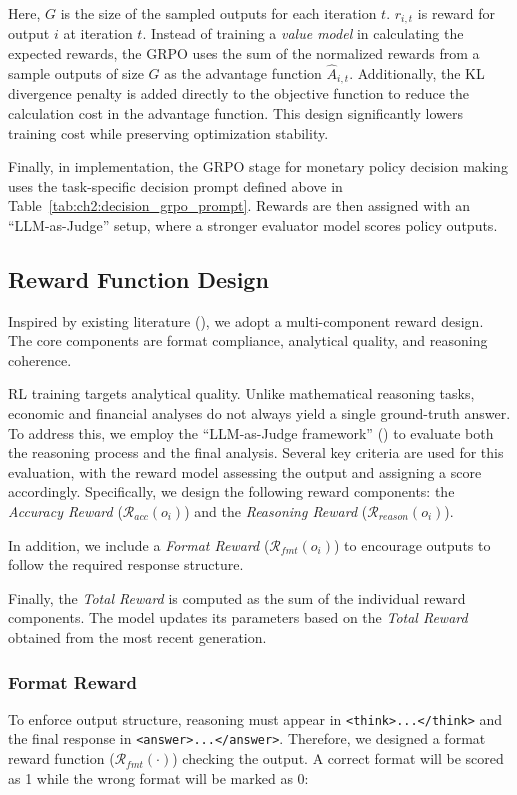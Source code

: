 Here, $G$ is the size of the sampled outputs for each iteration $t$. $r_{i,t}$ is reward for output $i$ at iteration $t$. Instead of training a \textit{value model} in calculating the expected rewards, the GRPO uses the sum of the normalized rewards from a sample outputs of size $G$ as the advantage function $\hat{A}_{i,t}$. Additionally, the KL divergence penalty is added directly to the objective function to reduce the calculation cost in the advantage function. This design significantly lowers training cost while preserving optimization stability.



Finally, in implementation, the GRPO stage for monetary policy decision making uses the task-specific decision prompt defined above in Table~\ref{tab:ch2:decision_grpo_prompt}. Rewards are then assigned with an ``LLM-as-Judge'' setup, where a stronger evaluator model scores policy outputs.


\subsection*{Reward Function Design}\label{ch2:sec:mode_training:reward_function}
% 


Inspired by existing literature (\cite{qian2025fino1}), we adopt a multi-component reward design. The core components are format compliance, analytical quality, and reasoning coherence.

RL training targets analytical quality. Unlike mathematical reasoning tasks, economic and financial analyses do not always yield a single ground-truth answer. To address this, we employ the ``LLM-as-Judge framework'' (\cite{zheng2024judging}) to evaluate both the reasoning process and the final analysis. Several key criteria are used for this evaluation, with the reward model assessing the output and assigning a score accordingly. Specifically, we design the following reward components: the \textit{Accuracy Reward} ($\mathcal{R}_{acc}(o_i)$) and the \textit{Reasoning Reward} ($\mathcal{R}_{reason}(o_i)$). 

In addition, we include a \textit{Format Reward} ($\mathcal{R}_{fmt}(o_i)$) to encourage outputs to follow the required response structure.


Finally, the \textit{Total Reward} is computed as the sum of the individual reward components. The model updates its parameters based on the \textit{Total Reward} obtained from the most recent generation.


\subsubsection*{Format Reward}
To enforce output structure, reasoning must appear in \texttt{<think>...</think>} and the final response in \texttt{<answer>...</answer>}. Therefore, we designed a format reward function ($\mathcal{R}_{fmt}(\cdot)$) checking the output. A correct format will be scored as 1 while the wrong format will be marked as 0:


